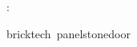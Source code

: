 \documentclass{article}
\begin{document}
\ExplSyntaxOn
\dtexLoadTextures:
\hbox
  {
     \kern10bp  \kern10bp  \kern10bp 
  }
\ExplSyntaxOff
\par\kern3bp
{\ttfamily\scriptsize
 brick\hspace{50bp}tech~panel\hspace{34bp}stone\hspace{52bp}door}
\end{document}
